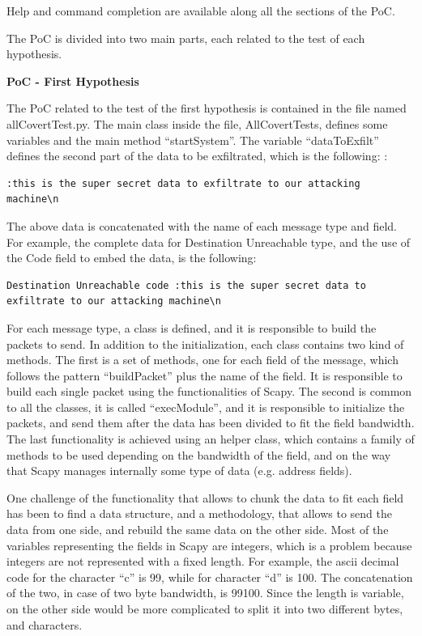 \documentclass[12pt]{article}
\begin{document}
Help and command completion are available along all the sections of the PoC.

The PoC is divided into two main parts, each related to the test of each hypothesis.


\textbf{PoC - First Hypothesis}


The PoC related to the test of the first hypothesis is contained in the file named allCovertTest.py. The main class inside the file, AllCovertTests, defines some variables and the main method ``startSystem''. The variable ``dataToExfilt'' defines the second part of the data to be exfiltrated, which is the following: : 

\begin{lstlisting}[style=python,basicstyle=\ttfamily\small]
 :this is the super secret data to exfiltrate to our attacking machine\n
\end{lstlisting}

\vspace{-15pt}
The above data is concatenated with the name of each message type and field. For example, the complete data for Destination Unreachable type, and the use of the Code field to embed the data, is the following:
\begin{lstlisting}[style=python,basicstyle=\ttfamily\small]
 Destination Unreachable code :this is the super secret data to exfiltrate to our attacking machine\n
\end{lstlisting}

For each message type, a class is defined, and it is responsible to build the packets to send. In addition to the initialization, each class contains two kind of methods. The first is a set of methods, one for each field of the message, which follows the pattern ``buildPacket'' plus the name of the field. It is responsible to build each single packet using the functionalities of Scapy. The second is common to all the classes, it is called ``execModule'', and it is responsible to initialize the packets, and send them after the data has been divided to fit the field bandwidth. The last functionality is achieved using an helper class, which contains a family of methods to be used depending on the bandwidth of the field, and on the way that Scapy manages internally some type of data (e.g. address fields).

One challenge of the functionality that allows to chunk the data to fit each field has been to find a data structure, and a methodology, that allows to send the data from one side, and rebuild the same data on the other side. Most of the variables representing the fields in Scapy are integers, which is a problem because integers are not represented with a fixed length. For example, the ascii decimal code for the character ``c'' is 99, while for character ``d'' is 100. The concatenation of the two, in case of two byte bandwidth, is 99100. Since the length is variable, on the other side would be more complicated to split it into two different bytes, and characters.
\end{document}
